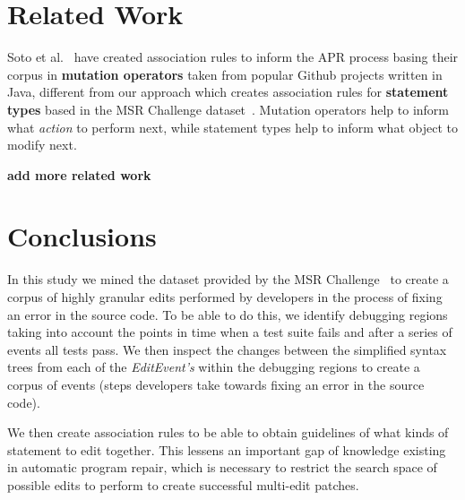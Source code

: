 \documentclass[sigconf]{acmart}
\newcommand{\todo}[1]
  {{\scriptsize \textbf{\color{red} {#1}}}}
\begin{document}
\section{Related Work}
\label{relWork}
Soto et al.~\cite{Soto18} have created association rules to inform the APR
process basing their corpus in \textbf{mutation operators} taken from popular Github projects
written in Java, 
different from our approach which creates association rules for \textbf{statement types} 
based in the MSR Challenge dataset~\cite{msr18challenge}. Mutation operators help to 
inform what \textit{action} to perform next, while statement types help to inform what
object to modify next. 

\todo{add more related work}

\section{Conclusions}
\label{conclusions}
In this study we mined the dataset provided by the MSR Challenge~\cite{msr18challenge}
to create a corpus of highly granular edits performed by developers in the process
of fixing an error in the source code. To be able to do this, we identify debugging
regions taking into account the points in time when a test suite fails and after a 
series of events all tests pass. We then inspect the changes between the simplified 
syntax trees from each
of the \textit{EditEvent's} within the debugging regions to create a corpus of 
events (steps developers take towards fixing an error in the source code).

We then create association rules to be able to obtain guidelines of what kinds of
statement to edit together. This lessens an important gap of knowledge existing
in automatic program repair, which is necessary to restrict the search space of 
possible edits to perform to create successful multi-edit patches.
\end{document}
